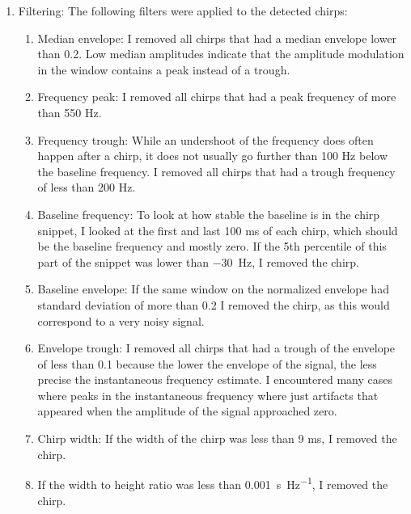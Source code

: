 \begin{enumerate}
  \item Filtering:
    The following filters were applied to the detected chirps:
    \begin{enumerate}

      \item Median envelope: I removed all chirps that had a median envelope
        lower than 0.2. Low median amplitudes indicate that the amplitude
        modulation in the window contains a peak instead of a trough.

      \item Frequency peak: I removed all chirps that had a peak frequency of
        more than 550 \si{\hertz}.

      \item Frequency trough: While an undershoot of the frequency does often
        happen after a chirp, it does not usually go further than 100
        \si{\hertz} below the baseline frequency. I removed all chirps that
        had a trough frequency of less than 200 \si{\hertz}.

      \item Baseline frequency: To look at how stable the baseline is in the
        chirp snippet, I looked at the first and last 100 \si{\milli\second}
        of each chirp, which should be the baseline frequency and mostly zero.
        If the 5th percentile of this part of the snippet was lower than
        \SI{-30}{\hertz}, I removed the chirp.

      \item Baseline envelope: If the same window on the normalized envelope
        had standard deviation of more than 0.2 I removed the chirp, as this
        would correspond to a very noisy signal.

      \item Envelope trough: I removed all chirps that had a trough of the
        envelope of less than 0.1 because the lower the envelope of the signal,
        the less precise the instantaneous frequency estimate. I encountered
        many cases where peaks in the instantaneous frequency where just
        artifacts that appeared when the amplitude of the signal approached
        zero.

      \item Chirp width: If the width of the chirp was less than 9
        \si{\milli\second}, I removed the chirp.

      \item If the width to height ratio was less than
        \SI{0.001}{\second\per\hertz}, I removed the chirp.


\end{enumerate}
\end{enumerate}
